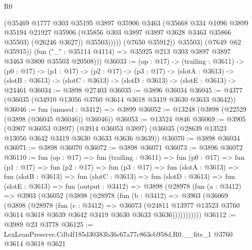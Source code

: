 \begin{lexlean}{R0}
\begin{coremodule}
                      (@35469
                        @1777
                        @303
                        @35195
                        @3897
                        @35906
                        @3463
                        (@35668
                          @334
                          @1096
                          @3899
                          @35194
                          @21927
                          @35906
                          (@35856 @303 @3897 @3897 @3628 @3463 @35866 @35503)
                          (@26246 @3627))
                        @35503)))))
              (@7650 @35912))
            @35503)
          (@7649 @62 @35915))
        (fun ("_" : @35114 @4114) => @35925 @213 @303 @3897 @3897 @3463 @3800 @35503 @20508)))
@36033 := (op : @17) ->
  (trailing : @3611) ->
  (p0 : @17) ->
  (p1 : @17) ->
  (p2 : @17) ->
  (p3 : @17) ->
  (slotA : @3613) ->
  (slotB : @3613) -> (slotC : @3613) -> (slotD : @3613) -> (slotE : @3613) -> @24461
@36034 := @3898 @27403
@36035 := @3896 @36034
@36045 := @4377 (@36035 (@34910 @13056 @3760 @3614 @3618 @3419 @3630 @3633 @3642))
@36046 := fun (unused : @3412) => @3899
@36052 := @13248 (@3898 (@22529 (@3898 (@36045 @36046)) @36046))
@36053 := @13524 @846
@36069 := @3905
    (@3907 @36053 @3897)
    (@3914 @36053 @3897)
    (@36035 (@28639 @13523 @13056 @3642 @3419 @3630 @3633 @3636 @3639))
@36070 := @3898 @36034
@36071 := @3898 @36070
@36072 := @3898 @36071
@36073 := @3896 @36072
@36110 := fun (op : @17) =>
  fun (trailing : @3611) =>
  fun (p0 : @17) =>
  fun (p1 : @17) =>
  fun (p2 : @17) =>
  fun (p3 : @17) =>
  fun (slotA : @3613) =>
  fun (slotB : @3613) =>
  fun (slotC : @3613) =>
  fun (slotD : @3613) =>
  fun (slotE : @3613) =>
  fun (output : @3412) =>
  @3898
    (@28978
      (fun (a : @3412) =>
      @3903
        (@36052
          (@3898
            (@28978
              (fun (b : @3412) =>
              @3903
                (@36069
                  (@3898
                    (@28978
                      (fun (c : @3412) =>
                      @36073
                        (@24811
                          @13977
                          @13523
                          @3760
                          @3614
                          @3618
                          @3639
                          @3642
                          @3419
                          @3630
                          @3633
                          @3636)))))))))))
@36112 := @3989 @23 @3778
@36125 := LexLeanPreserve.Cdb4f185d30383b36c67a77c863eb958d.R0.__fits_1
    @3760
    @3614
    @3618
    @3621

\end{coremodule}
\end{lexlean}
